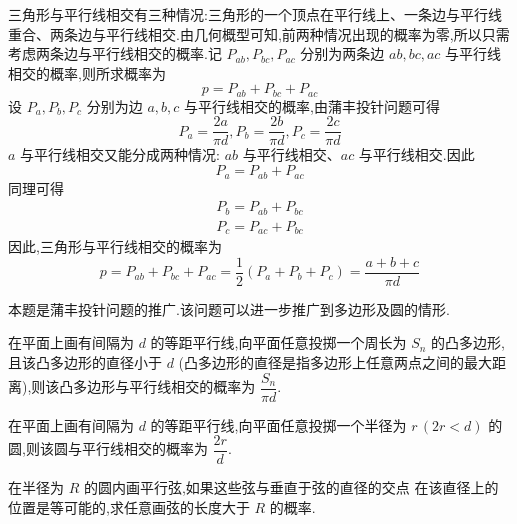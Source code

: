 \begin{solution}
    三角形与平行线相交有三种情况:三角形的一个顶点在平行线上、一条边与平行线重合、两条边与平行线相交.由几何概型可知,前两种情况出现的概率为零,所以只需考虑两条边与平行线相交的概率.记 $P_{ab}, P_{bc}, P_{ac}$ 分别为两条边 $ab, bc, ac$ 与平行线相交的概率,则所求概率为
    $$
    p = P_{ab} + P_{bc} + P_{ac}
    $$
    设 $P_a, P_b, P_c$ 分别为边 $a,b,c$ 与平行线相交的概率,由蒲丰投针问题可得
    $$
    P_a = \dfrac{2a}{\pi d}, P_b = \dfrac{2b}{\pi d}, P_c = \dfrac{2c}{\pi d}
    $$
    $a$ 与平行线相交又能分成两种情况: $ab$ 与平行线相交、$ac$ 与平行线相交.因此
    $$
    P_a = P_{ab} + P_{ac}
    $$
    同理可得
    $$
    \begin{aligned}
        P_b = P_{ab} + P_{bc} \\
        P_c = P_{ac} + P_{bc}
    \end{aligned}
    $$
    因此,三角形与平行线相交的概率为
    $$
    p = P_{ab} + P_{bc} + P_{ac} = \dfrac{1}{2} (P_a + P_b + P_c) = \dfrac{a+b+c}{\pi d}
    $$
\end{solution}

\begin{note}
    \indent 本题是蒲丰投针问题的推广.该问题可以进一步推广到多边形及圆的情形.

    在平面上画有间隔为 $d$ 的等距平行线,向平面任意投掷一个周长为 $S_n$ 的凸多边形,且该凸多边形的直径小于 $d$ (凸多边形的直径是指多边形上任意两点之间的最大距离),则该凸多边形与平行线相交的概率为 $\dfrac{S_n}{\pi d}$.

    在平面上画有间隔为 $d$ 的等距平行线,向平面任意投掷一个半径为 $r \, (2r < d)$ 的圆,则该圆与平行线相交的概率为 $\dfrac{2r}{d}$.
\end{note}

\question 在半径为 $R$ 的圆内画平行弦,如果这些弦与垂直于弦的直径的交点 在该直径上的位置是等可能的,求任意画弦的长度大于 $R$ 的概率.

